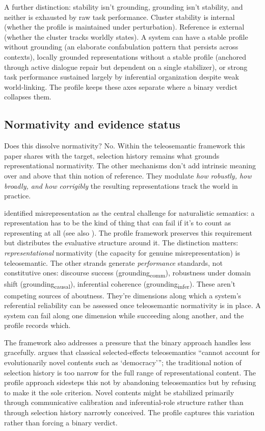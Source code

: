 \documentclass[12pt]{article}
\newcommand{\gcausal}{grounding\textsubscript{causal}}
\newcommand{\gcomm}{grounding\textsubscript{comm}}
\newcommand{\ginfer}{grounding\textsubscript{infer}}
\begin{document}
A further distinction: stability isn't grounding, grounding isn't stability, and neither is exhausted by raw task performance. Cluster stability is internal (whether the profile is maintained under perturbation). Reference is external (whether the cluster tracks worldly states). A system can have a stable profile without grounding (an elaborate confabulation pattern that persists across contexts), locally grounded representations without a stable profile (anchored through active dialogue repair but dependent on a single stabilizer), or strong task performance sustained largely by inferential organization despite weak world-linking. The profile keeps these axes separate where a binary verdict collapses them.

\subsection{Normativity and evidence status}
\label{sec:normativity-evidence}

Does this dissolve normativity? No. Within the teleosemantic framework this paper shares with the target, selection history remains what grounds representational normativity. The other mechanisms don't add intrinsic meaning over and above that thin notion of reference. They modulate \emph{how robustly, how broadly, and how corrigibly} the resulting representations track the world in practice.

\textcite{millikan_1990_compare_contrast_teleosemantics} identified misrepresentation as the central challenge for naturalistic semantics: a representation has to be the kind of thing that can fail if it's to count as representing at all (see also \citealt{neander_2017_mark_of_mental}). The profile framework preserves this requirement but distributes the evaluative structure around it. The distinction matters: \emph{representational} normativity (the capacity for genuine misrepresentation) is teleosemantic. The other strands generate \emph{performance} standards, not constitutive ones: discourse success (\gcomm{}), robustness under domain shift (\gcausal{}), inferential coherence (\ginfer{}). These aren't competing sources of aboutness. They're dimensions along which a system's referential reliability can be assessed once teleosemantic normativity is in place. A system can fail along one dimension while succeeding along another, and the profile records which.

The framework also addresses a pressure that the binary approach handles less gracefully. \textcite[1]{roloff_2025_indispensability_proper_functions} argues that classical selected-effects teleosemantics \enquote{cannot account for evolutionarily novel contents such as `democracy'}; the traditional notion of selection history is too narrow for the full range of representational content. The profile approach sidesteps this not by abandoning teleosemantics but by refusing to make it the sole criterion. Novel contents might be stabilized primarily through communicative calibration and inferential-role structure rather than through selection history narrowly conceived. The profile captures this variation rather than forcing a binary verdict.
\end{document}
